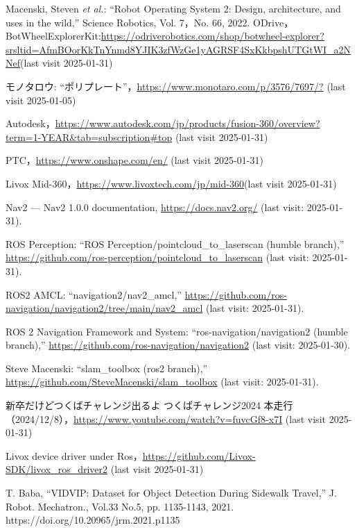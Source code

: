 \documentclass[twocolumn,9pt]{jsproceedings}
\begin{document}
\footnotesize
\begin{thebibliography}{99}
  Macenski, Steven {\it et al.}: ``Robot Operating System 2: Design, architecture, and uses in the wild,''
  Science Robotics, Vol. 7，No. 66, 2022.
  ODrive，BotWheelExplorerKit:\url{https://odriverobotics.com/shop/botwheel-explorer?srsltid=AfmBOorKkTnYnmd8YJIK3zfWzGe1yAGRSF4SxKkbpshUTGtWI_a2NNef}(last visit 2025-01-31)

  モノタロウ: ``ポリプレート''，\url{https://www.monotaro.com/p/3576/7697/?} (last visit 2025-01-05)

  
  Autodesk，\url{https://www.autodesk.com/jp/products/fusion-360/overview?term=1-YEAR&tab=subscription#top} (last visit 2025-01-31)
  
  PTC，\url{https://www.onshape.com/en/} (last visit 2025-01-31)
  
  Livox Mid-360，\url{https://www.livoxtech.com/jp/mid-360}(last visit 2025-01-31)
  
  Nav2 — Nav2 1.0.0 documentation, \url{https://docs.nav2.org/} (last visit: 2025-01-31).
  
  ROS Perception: ``ROS Perception/pointcloud\_to\_laserscan (humble branch),'' \url{https://github.com/ros-perception/pointcloud_to_laserscan} (last visit: 2025-01-31).
  
  ROS2 AMCL: ``navigation2/nav2\_amcl,'' \url{https://github.com/ros-navigation/navigation2/tree/main/nav2_amcl}  (last visit: 2025-01-31).
  
  ROS 2 Navigation Framework and System: ``ros-navigation/navigation2 (humble branch),'' \url{https://github.com/ros-navigation/navigation2} (last visit: 2025-01-30).
  
  Steve Macenski: ``slam\_toolbox (ros2 branch),'' \url{https://github.com/SteveMacenski/slam_toolbox} (last visit: 2025-01-31).

  新卒だけどつくばチャレンジ出るよ つくばチャレンジ2024 本走行（2024/12/8），\url{https://www.youtube.com/watch?v=fuvcGf8-x7I} (last visit 2025-01-31)
  
  Livox device driver under Ros，\url{https://github.com/Livox-SDK/livox_ros_driver2} (last visit 2025-01-31)

  T. Baba, “VIDVIP: Dataset for Object Detection During Sidewalk Travel,” J. Robot. Mechatron., Vol.33 No.5, pp. 1135-1143, 2021. https://doi.org/10.20965/jrm.2021.p1135
  
\end{thebibliography}
\normalsize

\clearpage
\end{document}
